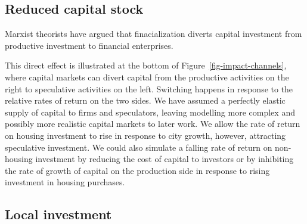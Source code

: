 

\subsection{Reduced capital stock}

Marxist theorists \cite{lefebvreRevolutionUrbaine1970, harveyClassmonopolyRentFinance1974, harveyUrbanProcessCapitalism1978, christophersRevisitingUrbanizationCapital2011} have argued that finacialization diverts capital investment from productive investment to financial enterprises. 

This direct effect is illustrated at the bottom of Figure~\ref{fig-impact-channels}, where capital markets can divert capital from the productive activities on the right to speculative activities on the left.  Switching happens in response to the relative rates of return on the two sides. We have assumed a perfectly elastic supply of capital to firms and speculators, leaving modelling more complex and possibly more realistic capital markets to later work.  We allow the rate of return on housing investment to rise in response to city growth, however, attracting speculative investment. We could also simulate a falling rate of return on non-housing investment by reducing the cost of capital to investors or by inhibiting the rate of growth of capital on the production side in response to rising investment in housing purchases. %


\subsection{Local investment}

